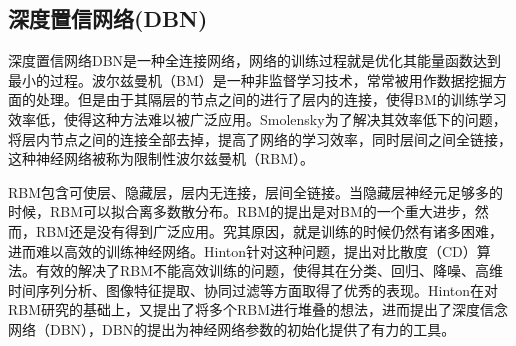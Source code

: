 \subsection{深度置信网络(DBN)}
深度置信网络DBN是一种全连接网络，网络的训练过程就是优化其能量函数达到最小的过程。波尔兹曼机（BM）是一种非监督学习技术，常常被用作数据挖掘方面的处理。但是由于其隔层的节点之间的进行了层内的连接，使得BM的训练学习效率低，使得这种方法难以被广泛应用。Smolensky为了解决其效率低下的问题，将层内节点之间的连接全部去掉，提高了网络的学习效率，同时层间之间全链接，这种神经网络被称为限制性波尔兹曼机（RBM）。

RBM包含可使层、隐藏层，层内无连接，层间全链接。当隐藏层神经元足够多的时候，RBM可以拟合离多数散分布。RBM的提出是对BM的一个重大进步，然而，RBM还是没有得到广泛应用。究其原因，就是训练的时候仍然有诸多困难，进而难以高效的训练神经网络。Hinton针对这种问题，提出对比散度（CD）算法。有效的解决了RBM不能高效训练的问题，使得其在分类、回归、降噪、高维时间序列分析、图像特征提取、协同过滤等方面取得了优秀的表现。Hinton在对RBM研究的基础上，又提出了将多个RBM进行堆叠的想法，进而提出了深度信念网络（DBN），DBN的提出为神经网络参数的初始化提供了有力的工具。




